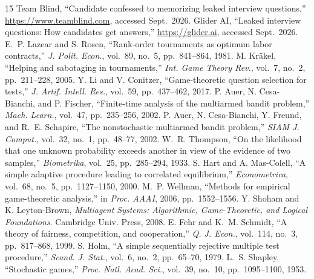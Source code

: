 \documentclass[conference]{IEEEtran}
\theoremstyle{plain}
\theoremstyle{definition}\newtheorem{definition}{Definition}
\begin{document}
\begin{thebibliography}{15}\footnotesize\setlength{\itemsep}{0pt}
 Team Blind, ``Candidate confessed to memorizing leaked interview questions,'' \url{https://www.teamblind.com}, accessed Sept.\ 2026.
 Glider AI, ``Leaked interview questions: How candidates get answers,'' \url{https://glider.ai}, accessed Sept.\ 2026.
 E.~P. Lazear and S. Rosen, ``Rank-order tournaments as optimum labor contracts,'' \emph{J. Polit. Econ.}, vol.~89, no.~5, pp.~841--864, 1981.
 M. Kr\"akel, ``Helping and sabotaging in tournaments,'' \emph{Int. Game Theory Rev.}, vol.~7, no.~2, pp.~211--228, 2005.
 Y. Li and V. Conitzer, ``Game-theoretic question selection for tests,'' \emph{J. Artif. Intell. Res.}, vol.~59, pp.~437--462, 2017.
 P. Auer, N. Cesa-Bianchi, and P. Fischer, ``Finite-time analysis of the multiarmed bandit problem,'' \emph{Mach. Learn.}, vol.~47, pp.~235--256, 2002.
 P. Auer, N. Cesa-Bianchi, Y. Freund, and R.~E. Schapire, ``The nonstochastic multiarmed bandit problem,'' \emph{SIAM J. Comput.}, vol.~32, no.~1, pp.~48--77, 2002.
 W.~R. Thompson, ``On the likelihood that one unknown probability exceeds another in view of the evidence of two samples,'' \emph{Biometrika}, vol.~25, pp.~285--294, 1933.
 S. Hart and A. Mas-Colell, ``A simple adaptive procedure leading to correlated equilibrium,'' \emph{Econometrica}, vol.~68, no.~5, pp.~1127--1150, 2000.
 M.~P. Wellman, ``Methods for empirical game-theoretic analysis,'' in \emph{Proc. AAAI}, 2006, pp.~1552--1556.
 Y. Shoham and K. Leyton-Brown, \emph{Multiagent Systems: Algorithmic, Game-Theoretic, and Logical Foundations}. Cambridge Univ. Press, 2008.
 E. Fehr and K.~M. Schmidt, ``A theory of fairness, competition, and cooperation,'' \emph{Q. J. Econ.}, vol.~114, no.~3, pp.~817--868, 1999.
 S. Holm, ``A simple sequentially rejective multiple test procedure,'' \emph{Scand. J. Stat.}, vol.~6, no.~2, pp.~65--70, 1979.
 L.~S. Shapley, ``Stochastic games,'' \emph{Proc. Natl. Acad. Sci.}, vol.~39, no.~10, pp.~1095--1100, 1953.
\end{thebibliography}
\end{document}

